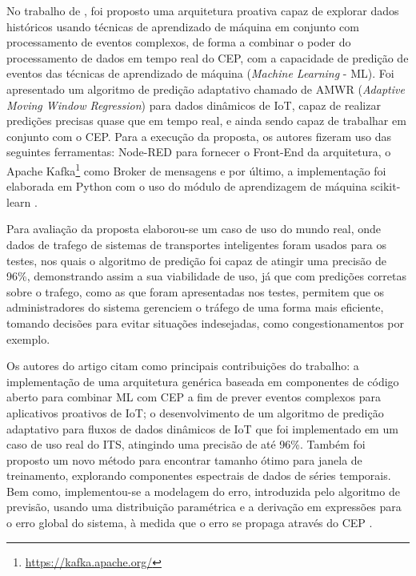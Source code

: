 \documentclass[ti,table]{texufpel} %
\begin{document}
     No trabalho de \cite{art4akbar2017predictive}, foi proposto uma arquitetura proativa capaz de explorar dados históricos usando técnicas de aprendizado de máquina em conjunto com processamento de eventos complexos, de forma a combinar o poder do processamento de dados em tempo real do CEP, com a capacidade de predição de eventos das técnicas de aprendizado de máquina (\textit{Machine Learning} - ML). Foi apresentado um algoritmo de predição adaptativo chamado de AMWR (\textit{Adaptive Moving Window Regression}) para dados dinâmicos de IoT, capaz de realizar predições precisas quase que em tempo real, e ainda sendo capaz de trabalhar em conjunto com o CEP. Para a execução da proposta, os autores fizeram uso das seguintes ferramentas: Node-RED para fornecer o Front-End da arquitetura, o Apache Kafka\footnote{\url{https://kafka.apache.org/}} como Broker de mensagens e por último, a implementação foi elaborada em Python com o uso do módulo de aprendizagem de máquina scikit-learn .   

      

     Para avaliação da proposta elaborou-se um caso de uso do mundo real, onde dados de trafego de sistemas de transportes inteligentes foram usados para os testes, nos quais o algoritmo de predição foi capaz de atingir uma precisão de 96\%, demonstrando assim a sua viabilidade de uso, já que com predições corretas sobre o trafego, como as que foram apresentadas nos testes, permitem que os administradores do sistema gerenciem o tráfego de uma forma mais eficiente, tomando decisões para evitar situações indesejadas, como congestionamentos por exemplo.      

     Os autores do artigo citam como principais contribuições do trabalho: a implementação de uma arquitetura genérica baseada em componentes de código aberto para combinar ML com CEP a fim de prever eventos complexos para aplicativos proativos de IoT; o desenvolvimento de um algoritmo de predição adaptativo para fluxos de dados dinâmicos de IoT que foi implementado em um caso de uso real do ITS, atingindo uma precisão de até 96\%. Também foi proposto um novo método para encontrar tamanho ótimo para janela de treinamento, explorando componentes espectrais de dados de séries temporais. Bem como, implementou-se a modelagem do erro, introduzida pelo algoritmo de previsão, usando uma distribuição paramétrica e a derivação em expressões para o erro global do sistema, à medida que o erro se propaga através do CEP \cite{art4akbar2017predictive}. 

  
\end{document}
